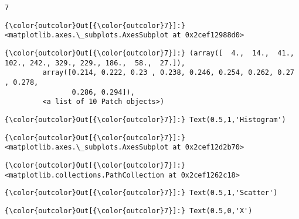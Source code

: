 \documentclass[11pt]{article}
\begin{document}
    \begin{Verbatim}[commandchars=\\\{\}]
7

    \end{Verbatim}

\begin{Verbatim}[commandchars=\\\{\}]
{\color{outcolor}Out[{\color{outcolor}7}]:} <matplotlib.axes.\_subplots.AxesSubplot at 0x2cef12988d0>
\end{Verbatim}
            
\begin{Verbatim}[commandchars=\\\{\}]
{\color{outcolor}Out[{\color{outcolor}7}]:} (array([  4.,  14.,  41., 102., 242., 329., 229., 186.,  58.,  27.]),
         array([0.214, 0.222, 0.23 , 0.238, 0.246, 0.254, 0.262, 0.27 , 0.278,
                0.286, 0.294]),
         <a list of 10 Patch objects>)
\end{Verbatim}
            
\begin{Verbatim}[commandchars=\\\{\}]
{\color{outcolor}Out[{\color{outcolor}7}]:} Text(0.5,1,'Histogram')
\end{Verbatim}
            
\begin{Verbatim}[commandchars=\\\{\}]
{\color{outcolor}Out[{\color{outcolor}7}]:} <matplotlib.axes.\_subplots.AxesSubplot at 0x2cef12d2b70>
\end{Verbatim}
            
\begin{Verbatim}[commandchars=\\\{\}]
{\color{outcolor}Out[{\color{outcolor}7}]:} <matplotlib.collections.PathCollection at 0x2cef1262c18>
\end{Verbatim}
            
\begin{Verbatim}[commandchars=\\\{\}]
{\color{outcolor}Out[{\color{outcolor}7}]:} Text(0.5,1,'Scatter')
\end{Verbatim}
            
\begin{Verbatim}[commandchars=\\\{\}]
{\color{outcolor}Out[{\color{outcolor}7}]:} Text(0.5,0,'X')
\end{Verbatim}
            
\end{document}

